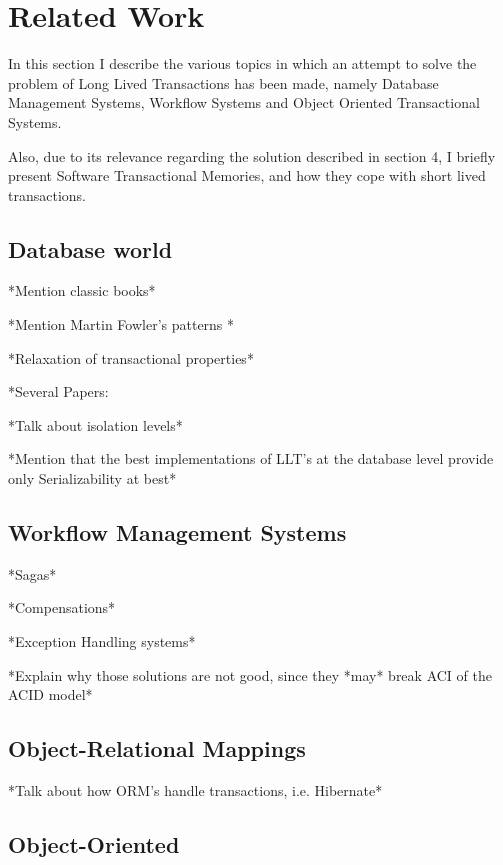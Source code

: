 \documentclass{llncs}
\begin{document}
\section{Related Work}

In this section I describe the various topics in which an attempt to
solve the problem of Long Lived Transactions has been made, namely
Database Management Systems, Workflow Systems and Object Oriented
Transactional Systems.

Also, due to its relevance regarding the
solution described in section 4, I briefly present Software
Transactional Memories, and how they cope with short lived transactions.

\subsection{Database world}

*Mention classic books*

*Mention Martin Fowler's patterns \cite{fowler2003patterns}*

*Relaxation of transactional properties*

*Several Papers: \cite{hagmann1991implementing} \cite{garcia1987sagas}
\cite{salem1989altruistic}

*Talk about isolation levels*

*Mention that the best implementations of LLT's at the database level
provide only Serializability at best*

\subsection{Workflow Management Systems}

\cite{alonso1996advanced}

*Sagas* \cite{garcia1987sagas}

\cite{798492}

*Compensations*

*Exception Handling systems*

*Explain why those solutions are not good, since they *may* break ACI
of the ACID model*

\subsection{Object-Relational Mappings}

*Talk about how ORM's handle transactions, i.e. Hibernate*

\subsection{Object-Oriented}
\end{document}
